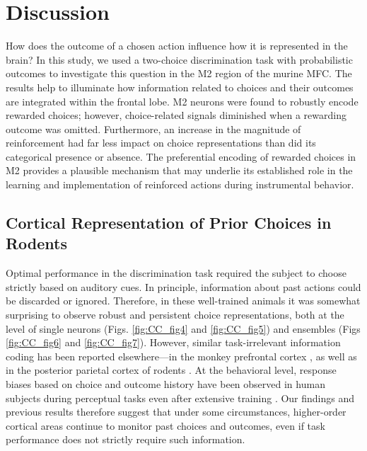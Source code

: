 
\section{Discussion}
How does the outcome of a chosen action influence how it is represented in the brain? In this study, we used a two-choice discrimination task with probabilistic outcomes to investigate this question in the M2 region of the murine MFC. The results help to illuminate how information related to choices and their outcomes are integrated within the frontal lobe. M2 neurons were found to robustly encode rewarded choices; however, choice-related signals diminished when a rewarding outcome was omitted. Furthermore, an increase in the magnitude of reinforcement had far less impact on choice representations than did its categorical presence or absence. The preferential encoding of rewarded choices in M2 provides a plausible mechanism that may underlie its established role in the learning and implementation of reinforced actions during instrumental behavior.

\subsection{Cortical Representation of Prior Choices in Rodents}
Optimal performance in the discrimination task required the subject to choose strictly based on auditory cues. In principle, information about past actions could be discarded or ignored. Therefore, in these well-trained animals it was somewhat surprising to observe robust and persistent choice representations, both at the level of single neurons (Figs. \ref{fig:CC_fig4} and \ref{fig:CC_fig5}) and ensembles (Figs \ref{fig:CC_fig6} and \ref{fig:CC_fig7}). However, similar task-irrelevant information coding has been reported elsewhere—in the monkey prefrontal cortex \citep{genovesio2014autonomous}, as well as in the posterior parietal cortex of rodents \citep{morcos2016history}. At the behavioral level, response biases based on choice and outcome history have been observed in human subjects during perceptual tasks even after extensive training \citep{frund2014quantifying, abrahamyan2016adaptable}. Our findings and previous results therefore suggest that under some circumstances, higher-order cortical areas continue to monitor past choices and outcomes, even if task performance does not strictly require such information.

